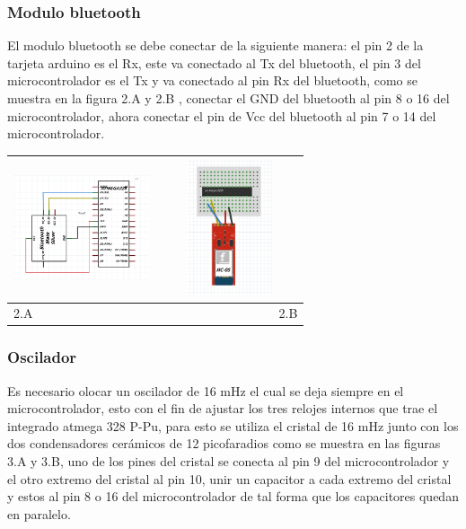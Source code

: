 \documentclass[12]{article}
\newenvironment{Figure}
{\par\medskip\noindent\minipage{\linewidth}}
{\endminipage\par\medskip}
\begin{document}
\begin{multicols}{2}
\subsubsection{Modulo bluetooth}
El modulo bluetooth se debe conectar de la siguiente manera: el pin 2 de la tarjeta arduino es el Rx, este va conectado al Tx del bluetooth, el pin 3 del microcontrolador es el Tx y va conectado al pin Rx del bluetooth, como se muestra en la figura 2.A y 2.B , conectar el GND del bluetooth al pin 8  o 16 del microcontrolador, ahora conectar el pin de Vcc del bluetooth al pin 7 o 14 del microcontrolador.

\begin{Figure}
\center
\begin{tabular}{|l|r|}
\hline
\includegraphics[width=4cm, height=4cm]{img/bluetoothesq.png} & \includegraphics[width=4cm, height=4cm]{img/bluetoothmon.png} \\ \hline
2.A & 2.B \\ \hline
\end{tabular}
\label{fig:g2}
\end{Figure}

\subsubsection{Oscilador}
Es necesario olocar un oscilador de 16 mHz el cual se deja siempre en el microcontrolador, esto  con el fin de ajustar los tres relojes internos que trae el integrado atmega 328 P-Pu, para esto se utiliza el cristal de 16 mHz junto con los dos condensadores cerámicos de 12 picofaradios como se muestra en las figuras 3.A y 3.B, uno de los pines del cristal se conecta al pin 9 del microcontrolador y el otro extremo del cristal al pin 10, unir un capacitor a cada extremo del cristal y estos al pin 8 o 16 del microcontrolador de tal forma que los capacitores quedan en paralelo.\\


\end{multicols}
\end{document}
